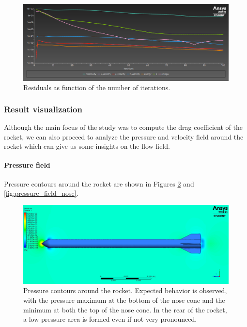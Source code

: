 \begin{figure}[H]
    \centering
    \includegraphics[width=.8\textwidth]{img/Results/Residuals_plot.png}
    \caption{Residuals as function of the number of iterations.}
    \label{fig:residuals}
\end{figure}


\subsubsection{Result visualization}
\label{subsubsec:result_visualization}

Although the main focus of the study was to compute the drag coefficient of the rocket, we can also proceed to analyze the pressure and velocity field around the rocket which can give us some insights on the flow field.

\paragraph{Pressure field}

Pressure contours around the rocket are shown in Figures \ref{fig:pressure_field} and \ref{fig:pressure_field_nose}.

\begin{figure}[H]
    \centering
    \includegraphics[width=.8\textwidth]{img/Results/Coutours_Pressure.png}
    \caption{Pressure contours around the rocket. Expected behavior is observed, with the pressure maximum at the bottom of the nose cone and the minimum at both the top of the nose cone. In the rear of the rocket, a low pressure area is formed even if not very pronounced.}
    \label{fig:pressure_field}
\end{figure}


